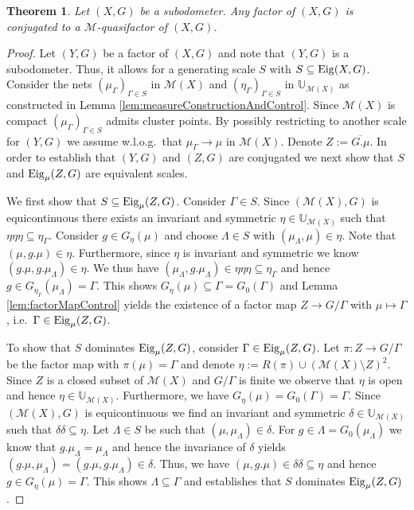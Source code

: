 \documentclass[12pt, reqno]{amsart}
\newtheorem{theorem}{Theorem}[section]
\theoremstyle{definition}
\theoremstyle{remark}
\numberwithin{equation}{section}
\theoremstyle{theorem}
\theoremstyle{remark}
\def\Eig{{\rm Eig}}
\begin{document}
\begin{theorem}
\label{the:factorsAreMQuasifactors}
    Let $(X,G)$ be a subodometer. 
    Any factor of $(X,G)$ is conjugated to a $\mathcal{M}$-quasifactor of $(X,G)$.  
\end{theorem}
\begin{proof}
    Let $(Y,G)$ be a factor of $(X,G)$ and note that $(Y,G)$ is a subodometer. 
    Thus, it allows for a generating scale $S$ with $S\subseteq \Eig(X,G)$. 
    Consider the nets $(\mu_\Gamma)_{\Gamma\in S}$ in $\mathcal{M}(X)$ and $(\eta_\Gamma)_{\Gamma\in S}$ in $\mathbb{U}_{\mathcal{M}(X)}$ as constructed in Lemma \ref{lem:measureConstructionAndControl}. 
    Since $\mathcal{M}(X)$ is compact $(\mu_\Gamma)_{\Gamma\in S}$ admits cluster points. By possibly restricting to another scale for $(Y,G)$ we assume w.l.o.g.\ that $\mu_\Gamma \to \mu$ in $\mathcal{M}(X)$. Denote $Z:=\overline{G.\mu}$. 
    In order to establish that $(Y,G)$ and $(Z,G)$ are conjugated we next show that $S$ and $\Eig_\mu(Z,G)$ are equivalent scales. 
    
    We first show that $S\subseteq \Eig_\mu(Z,G)$. 
    Consider $\Gamma\in S$. Since $(\mathcal{M}(X),G)$ is equicontinuous there exists an invariant and symmetric $\eta\in \mathbb{U}_{\mathcal{M}(X)}$ such that $\eta\eta\eta\subseteq \eta_\Gamma$. 
    Consider $g\in G_\eta(\mu)$ and choose $\Lambda\in S$ with $(\mu_\Lambda,\mu)\in \eta$. 
    Note that $(\mu,g.\mu)\in \eta$. 
    Furthermore, since $\eta$ is invariant and symmetric we know $(g.\mu,g.\mu_\Lambda)\in \eta$. 
    We thus have $(\mu_\Lambda,g.\mu_\Lambda)\in \eta\eta\eta\subseteq \eta_\Gamma$ and hence $g\in G_{\eta_\Gamma}(\mu_\Lambda)=\Gamma$. 
    This shows $G_\eta(\mu)\subseteq \Gamma=G_0(\Gamma)$ and Lemma \ref{lem:factorMapControl} yields the existence of a factor map $Z\to G/\Gamma$ with $\mu\mapsto \Gamma$, i.e.\ $\Gamma\in \Eig_\mu(Z,G)$. 

    To show that $S$ dominates $\Eig_\mu(Z,G)$, consider $\Gamma\in \Eig_\mu(Z,G)$. 
    Let $\pi\colon Z\to G/\Gamma$ be the factor map with $\pi(\mu)=\Gamma$ and denote 
    $\eta:=R(\pi)\cup (\mathcal{M}(X)\setminus Z)^2.$
    Since $Z$ is a closed subset of $\mathcal{M}(X)$ and $G/\Gamma$ is finite we observe that $\eta$ is open and hence $\eta\in \mathbb{U}_{\mathcal{M}(X)}$. 
    Furthermore, we have $G_\eta(\mu)=G_0(\Gamma)=\Gamma$. 
    Since $(\mathcal{M}(X),G)$ is equicontinuous we find an invariant and symmetric $\delta\in \mathbb{U}_{\mathcal{M}(X)}$ such that $\delta\delta\subseteq \eta$. 
    Let $\Lambda\in S$ be such that $(\mu,\mu_\Lambda)\in \delta$. 
    For $g\in \Lambda=G_0(\mu_\Lambda)$ we know that $g.\mu_\Lambda=\mu_\Lambda$ and hence the invariance of $\delta$ yields
    $(g.\mu, \mu_\Lambda)=(g.\mu,g.\mu_\Lambda)\in \delta$. 
    Thus, we have $(\mu,g.\mu)\in \delta\delta\subseteq \eta$ and hence 
    $g\in G_\eta(\mu)=\Gamma$. 
    This shows $\Lambda\subseteq \Gamma$ and establishes that $S$ dominates $\Eig_\mu(Z,G)$. 
\end{proof}
\end{document}
